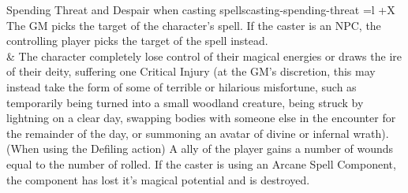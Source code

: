 \begin{table}[!htb]
\begin{GenesysTable}{Spending Threat and Despair when casting spells}{casting-spending-threat}{ =l +X}
                                        \newline
                                        The GM picks the target of the character's spell. If the caster is an NPC, the controlling player picks the target of the spell instead.\\
\despair\despair                    &   The character completely lose control of their magical energies or draws the ire of their deity, suffering one Critical Injury (at the GM's
                                        discretion, this may instead take the form of some of terrible or hilarious misfortune, such as temporarily being turned into a small woodland
                                        creature, being struck by lightning on a clear day, swapping bodies with someone else in the encounter for the remainder of the day, or
                                        summoning an avatar of divine or infernal wrath).\newline
                                        \newline
                                        (When using the Defiling action) A ally of the player gains a number of wounds equal to the number of \threat rolled.\newline
                                        \newline
                                        If the caster is using an Arcane Spell Component, the component has lost it's magical potential and is destroyed.\\
\end{GenesysTable}
\end{table}

\FloatBarrier

